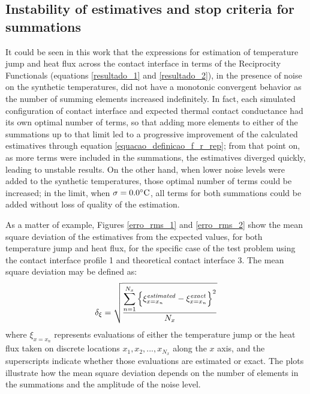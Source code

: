 \documentclass[12pt]{CHT-20}
\begin{document}
\subsection*{Instability of estimatives and stop criteria for summations}
It could be seen in this work that the expressions for estimation of temperature jump and heat flux across the contact interface in terms of the Reciprocity Functionals (equations \eqref{resultado_1} and \eqref{resultado_2}), in the presence of noise on the synthetic temperatures, did not have a monotonic convergent behavior as the number of summing elements increased indefinitely. In fact, each simulated configuration of contact interface and expected thermal contact conductance had its own optimal number of terms, so that adding more elements to either of the summations up to that limit led to a progressive improvement of the calculated estimatives through equation \eqref{equacao_definicao_f_r_rep}; from that point on, as more terms were included in the summations, the estimatives diverged quickly, leading to unstable results. On the other hand, when lower noise levels were added to the synthetic temperatures, those optimal number of terms could be increased; in the limit, when $\sigma = 0.0\celsius$, all terms for both summations could be added without loss of quality of the estimation. 

As a matter of example, Figures \ref{erro_rms_1} and \ref{erro_rms_2} show the mean square deviation of the estimatives from the expected values, for both temperature jump and heat flux, for the specific case of the test problem using the contact interface profile 1 and theoretical contact interface 3. The mean square deviation may be defined as:
\begin{equation}
\delta_{\xi} = \sqrt{\frac{\displaystyle\sum_{n=1}^{N_x}\left\lbrace \xi_{x=x_n}^\text{\textit{estimated}} - \xi_{x=x_n}^\text{\textit{exact}}\right \rbrace^2}{N_x}}
\end{equation}
where $\xi_{x=x_n}$ represents evaluations of either the temperature jump or the heat flux taken on discrete locations $x_1, x_2,..., x_{N_x}$ along the $x$ axis, and the superscripts indicate whether those evaluations are estimated or exact. The plots illustrate how the mean square deviation depends on the number of elements in the summations and the amplitude of the noise level.
\end{document}
